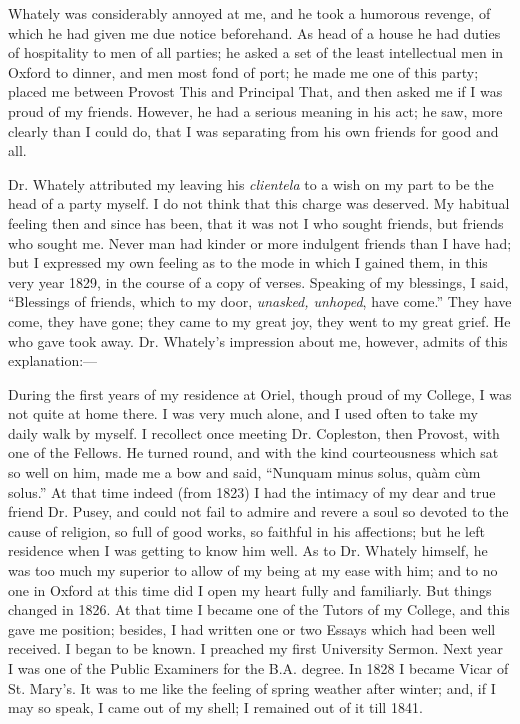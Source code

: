 Whately was considerably annoyed at me, and he took a humorous
revenge, of which he had given me due notice beforehand. As head of a
house he had duties of hospitality to men of all parties; he asked a
set of the least intellectual men in Oxford to dinner, and men most
fond of port; he made me one of this party; placed me between Provost This and Principal That, and
then asked me if I was proud of my friends. However, he had a serious
meaning in his act; he saw, more clearly than I could do, that I was
separating from his own friends for good and all.

Dr. Whately attributed my leaving his \emph{clientela} to a wish on
my part to be the head of a party myself. I do not think that this
charge was deserved. My habitual feeling then and since has been,
that it was not I who sought friends, but friends who sought me. Never
man had kinder or more indulgent friends than I have had; but I
expressed my own feeling as to the mode in which I gained them, in
this very year 1829, in the course of a copy of verses. Speaking of my blessings, I said, ``Blessings of friends, which to my
door, \emph{unasked, unhoped}, have come.'' They have come, they
have gone; they came to my great joy, they went to my great grief. He
who gave took away. Dr. Whately's impression about me, however,
admits of this explanation:—

During the first years of my residence at Oriel, though proud of my
College, I was not quite at home there. I was very much alone,
and I used often to take my daily walk by myself. I recollect once
meeting Dr. Copleston, then Provost, with one of the Fellows. He
turned round, and with the kind courteousness which sat so well on
him, made me a bow and said, ``Nunquam minus solus, quàm cùm solus.''
At that time indeed (from 1823) I had the intimacy of my dear and true
friend Dr. Pusey, and could not fail to admire and revere a soul so
devoted to the cause of religion, so full of good works, so faithful
in his affections; but he left residence when I was getting to know
him well. As to Dr. Whately himself, he was too much my superior to
allow of my being at my ease with him; and to no one in Oxford at
this time did I open my heart fully and familiarly. But things changed
in 1826. At that time I became one of the Tutors of my College, and
this gave me position; besides, I had written one or two Essays which
had been well received. I began to be known. I preached my first
University Sermon. Next year I was one of the Public Examiners for the
B.A. degree. In 1828 I became Vicar of St. Mary's. It was to
me like the feeling of spring weather after winter; and, if I may so
speak, I came out of my shell; I remained out of it till 1841.

